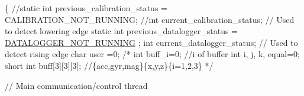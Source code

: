 \begin{DoxyCode}
\{
    \textcolor{comment}{//static int previous\_calibration\_status = CALIBRATION\_NOT\_RUNNING;}
    \textcolor{comment}{//int current\_calibration\_status; // Used to detect lowering edge}
    \textcolor{keyword}{static} \textcolor{keywordtype}{int} previous\_datalogger\_status = \hyperlink{datalogger_01_07Caio-PC's_01conflicted_01copy_012012-11-23_08_8h_a1a224da36800f52f56f30619849f7f5d}{DATALOGGER\_NOT\_RUNNING}
      ;
    \textcolor{keywordtype}{int} current\_datalogger\_status; \textcolor{comment}{// Used to detect rising edge}
    \textcolor{keywordtype}{char} user =0;
   \textcolor{comment}{/* int buff\_i=0; //i of buffer}
\textcolor{comment}{    int i, j, k, equal=0;}
\textcolor{comment}{    short int buff[3][3][3]; //\{acc,gyr,mag\}\{x,y,z\}\{i=1,2,3\}}
\textcolor{comment}{*/}

    \textcolor{comment}{// Main communication/control thread}


\end{DoxyCode}
